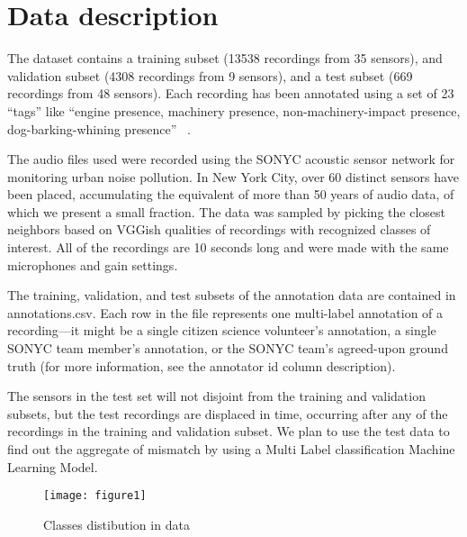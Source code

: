 \section{Data description}
The dataset contains a training subset (13538 recordings from 35 sensors), and validation subset (4308 recordings from 9 sensors), and a test subset (669 recordings from 48 sensors). Each recording has been annotated using a set of 23 “tags” like “engine presence, machinery presence, non-machinery-impact presence, dog-barking-whining presence” ~\cite{4}.

The audio files used were recorded using the SONYC acoustic sensor network for monitoring urban noise pollution. In New York City, over 60 distinct sensors have been placed, accumulating the equivalent of more than 50 years of audio data, of which we present a small fraction. The data was sampled by picking the closest neighbors based on VGGish qualities of recordings with recognized classes of interest. All of the recordings are 10 seconds long and were made with the same microphones and gain settings. 

The training, validation, and test subsets of the annotation data are contained in annotations.csv. Each row in the file represents one multi-label annotation of a recording—it might be a single citizen science volunteer's annotation, a single SONYC team member's annotation, or the SONYC team's agreed-upon ground truth (for more information, see the annotator id column description).

The sensors in the test set will not disjoint from the training and validation subsets, but the test recordings are displaced in time, occurring after any of the recordings in the training and validation subset. We plan to use the test data to find out the aggregate of mismatch by using a Multi Label classification Machine Learning Model.

	
	\begin{figure}[h!]
		
		\texttt{[image: figure1]}
		\caption{ Classes distibution in data}
	\end{figure}
	


	
	
	
	

	
	